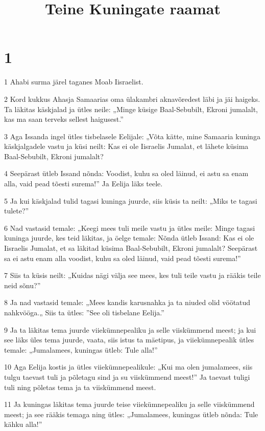 

\title{Teine Kuningate raamat}

\chapter{1}

\par 1 Ahabi surma järel taganes Moab Iisraelist.
\par 2 Kord kukkus Ahasja Samaarias oma ülakambri aknavõredest läbi ja jäi haigeks. Ta läkitas käskjalad ja ütles neile: „Minge küsige Baal-Sebubilt, Ekroni jumalalt, kas ma saan terveks sellest haigusest.”
\par 3 Aga Issanda ingel ütles tisbelasele Eelijale: „Võta kätte, mine Samaaria kuninga käskjalgadele vastu ja küsi neilt: Kas ei ole Iisraelis Jumalat, et lähete küsima Baal-Sebubilt, Ekroni jumalalt?
\par 4 Seepärast ütleb Issand nõnda: Voodist, kuhu sa oled läinud, ei astu sa enam alla, vaid pead tõesti surema!” Ja Eelija läks teele.
\par 5 Ja kui käskjalad tulid tagasi kuninga juurde, siis küsis ta neilt: „Miks te tagasi tulete?”
\par 6 Nad vastasid temale: „Keegi mees tuli meile vastu ja ütles meile: Minge tagasi kuninga juurde, kes teid läkitas, ja öelge temale: Nõnda ütleb Issand: Kas ei ole Iisraelis Jumalat, et sa läkitad küsima Baal-Sebubilt, Ekroni jumalalt? Seepärast sa ei astu enam alla voodist, kuhu sa oled läinud, vaid pead tõesti surema!”
\par 7 Siis ta küsis neilt: „Kuidas nägi välja see mees, kes tuli teile vastu ja rääkis teile neid sõnu?”
\par 8 Ja nad vastasid temale: „Mees kandis karusnahka ja ta niuded olid vöötatud nahkvööga.„ Siis ta ütles: ”See oli tisbelane Eelija.”
\par 9 Ja ta läkitas tema juurde viiekümnepealiku ja selle viiskümmend meest; ja kui see läks üles tema juurde, vaata, siis istus ta mäetipus, ja viiekümnepealik ütles temale: „Jumalamees, kuningas ütleb: Tule alla!”
\par 10 Aga Eelija kostis ja ütles viiekümnepealikule: „Kui ma olen jumalamees, siis tulgu taevast tuli ja põletagu sind ja su viiskümmend meest!” Ja taevast tuligi tuli ning põletas tema ja ta viiskümmend meest.
\par 11 Ja kuningas läkitas tema juurde teise viiekümnepealiku ja selle viiskümmend meest; ja see rääkis temaga ning ütles: „Jumalamees, kuningas ütleb nõnda: Tule kähku alla!”
